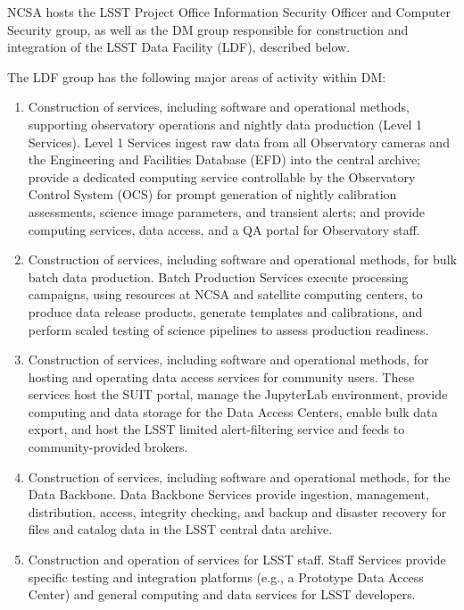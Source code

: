 NCSA hosts the \gls{LSST} Project Office Information Security Officer and Computer Security group, as well as the \gls{DM} group responsible for construction and integration of the \gls{LSST} Data Facility (\gls{LDF}), described below.

The \gls{LDF} group has the following major areas of activity within \gls{DM}:

\begin{enumerate}
	\item	\gls{Construction} of services, including software and operational methods, supporting observatory operations and nightly data production (Level 1 Services). Level 1 Services ingest raw data from all Observatory cameras and the Engineering and Facilities Database (\gls{EFD}) into the central archive; provide a dedicated computing service controllable by the Observatory Control System (\gls{OCS}) for prompt generation of nightly \gls{calibration} assessments, science image parameters, and \gls{transient} alerts; and provide computing services, data access, and a \gls{QA} portal for Observatory staff.
	\item	\gls{Construction} of services, including software and operational methods, for bulk batch data production. \gls{Batch Production} Services execute processing campaigns, using resources at \gls{NCSA} and satellite computing centers, to produce data release products, generate templates and calibrations, and perform scaled testing of science pipelines to assess production readiness.
	\item	\gls{Construction} of services, including software and operational methods, for hosting and operating data access services for community users. These services host the \gls{SUIT} portal, manage the JupyterLab environment, provide computing and data storage for the Data Access Centers, enable bulk data export, and host the \gls{LSST} limited alert-filtering service and feeds to community-provided brokers.
	\item	\gls{Construction} of services, including software and operational methods, for the \gls{Data Backbone}. \gls{Data Backbone} Services provide ingestion, management, distribution, access, integrity checking, and backup and disaster recovery for files and catalog data in the \gls{LSST} central data archive.
	\item	\gls{Construction} and operation of services for \gls{LSST} staff. Staff Services provide specific testing and integration platforms (e.g., a Prototype \gls{Data Access Center}) and general computing and data services for \gls{LSST} developers.

\end{enumerate}
